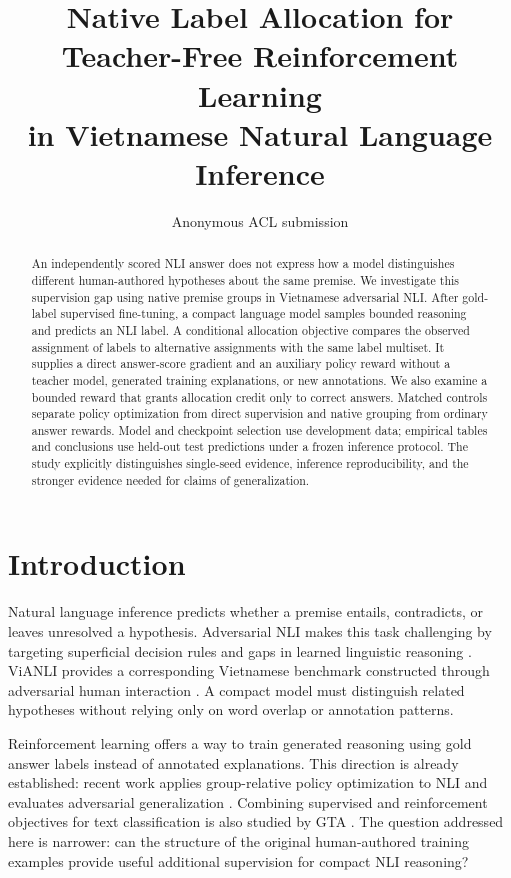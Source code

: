 \documentclass[11pt]{article}
\title{Native Label Allocation for Teacher-Free Reinforcement Learning\\in Vietnamese Natural Language Inference}
\author{Anonymous ACL submission}
\begin{document}
\maketitle
\begin{abstract}
An independently scored NLI answer does not express how a model distinguishes different human-authored hypotheses about the same premise. We investigate this supervision gap using native premise groups in Vietnamese adversarial NLI. After gold-label supervised fine-tuning, a compact language model samples bounded reasoning and predicts an NLI label. A conditional allocation objective compares the observed assignment of labels to alternative assignments with the same label multiset. It supplies a direct answer-score gradient and an auxiliary policy reward without a teacher model, generated training explanations, or new annotations. We also examine a bounded reward that grants allocation credit only to correct answers. Matched controls separate policy optimization from direct supervision and native grouping from ordinary answer rewards. Model and checkpoint selection use development data; empirical tables and conclusions use held-out test predictions under a frozen inference protocol.
The study explicitly distinguishes single-seed evidence, inference reproducibility, and the stronger evidence needed for claims of generalization.
\end{abstract}

\section{Introduction}
Natural language inference predicts whether a premise entails, contradicts, or leaves unresolved a hypothesis. Adversarial NLI makes this task challenging by targeting superficial decision rules and gaps in learned linguistic reasoning \citep{nie-etal-2020-adversarial}. ViANLI provides a corresponding Vietnamese benchmark constructed through adversarial human interaction \citep{huynh-etal-2025-vianli}. A compact model must distinguish related hypotheses without relying only on word overlap or annotation patterns.

Reinforcement learning offers a way to train generated reasoning using gold answer labels instead of annotated explanations. This direction is already established: recent work applies group-relative policy optimization to NLI and evaluates adversarial generalization \citep{mirallesgonzalez-etal-2025-grpo-nli}. Combining supervised and reinforcement objectives for text classification is also studied by GTA \citep{zeng-etal-2025-gta}. The question addressed here is narrower: can the structure of the original human-authored training examples provide useful additional supervision for compact NLI reasoning?
\end{document}
